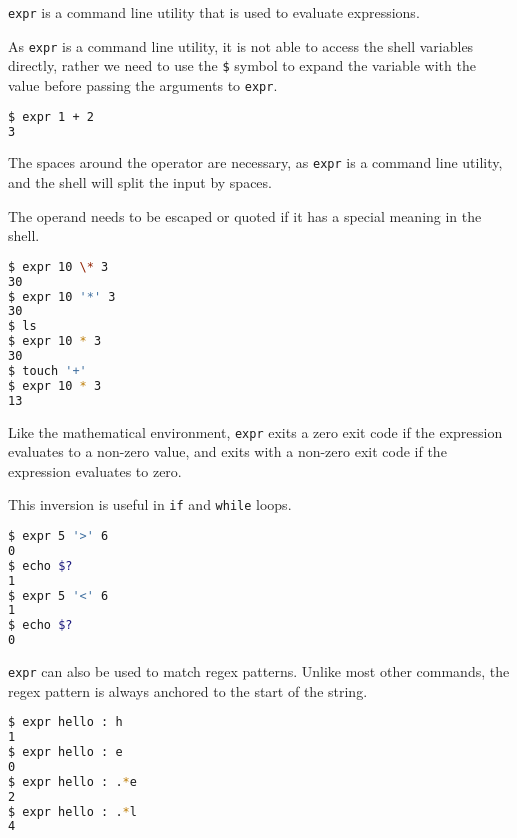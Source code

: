 \begin{definition}[EXPR]
  \lstinline|expr| is a command line utility that is used to evaluate expressions.
\end{definition}

As \lstinline|expr| is a command line utility, it is not able to access the shell variables directly, rather we need to use the \lstinline|$| symbol to expand the variable with the value before passing the arguments to \lstinline|expr|.

\begin{lstlisting}[language=bash]
$ expr 1 + 2
3
\end{lstlisting}

The spaces around the operator are necessary, as \lstinline|expr| is a command line utility, and the shell will split the input by spaces.

The operand needs to be escaped or quoted if it has a special meaning in the shell.

\begin{lstlisting}[language=bash]
$ expr 10 \* 3
30
$ expr 10 '*' 3
30
$ ls
$ expr 10 * 3
30
$ touch '+'
$ expr 10 * 3
13
\end{lstlisting}

Like the mathematical environment, \lstinline|expr| exits a zero exit code if the expression evaluates to a non-zero value, and exits with a non-zero exit code if the expression evaluates to zero.

This inversion is useful in \lstinline|if| and \lstinline|while| loops.

\begin{lstlisting}[language=bash]
$ expr 5 '>' 6
0
$ echo $?
1
$ expr 5 '<' 6
1
$ echo $?
0
\end{lstlisting}

\lstinline|expr| can also be used to match regex patterns.
Unlike most other commands, the regex pattern is always anchored to the start of the string.

\begin{lstlisting}[language=bash]
$ expr hello : h
1
$ expr hello : e
0
$ expr hello : .*e
2
$ expr hello : .*l
4
\end{lstlisting}

